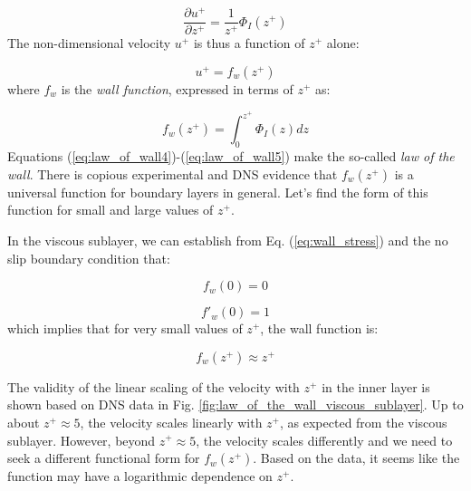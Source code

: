 \documentclass[12pt]{article}
\numberwithin{equation}{section}
\numberwithin{figure}{section}
\numberwithin{table}{section}
\begin{document}
\begin{equation}
  \frac{\partial u^+}{\partial z^+} = \frac{1}{z^+} \Phi_I\left(z^+\right)
  \label{eq:law_of_wall3}
\end{equation}
The non-dimensional velocity $u^+$ is thus a function of $z^+$ alone:

\begin{equation}
  u^+ = f_w(z^+)
  \label{eq:law_of_wall4}
\end{equation}
where $f_w$ is the \textit{wall function}, expressed in
terms of $z^+$ as:

\begin{equation}
  f_w(z^+) = \int_0^{z^+} \Phi_I(z) dz
  \label{eq:law_of_wall5}
\end{equation}
Equations (\ref{eq:law_of_wall4})-(\ref{eq:law_of_wall5}) make the so-called
\textit{law of the wall}.
There is copious experimental and DNS evidence that $f_w(z^+)$ is a universal
function for boundary layers in general.
Let's find the form of this function for small and large values of $z^+$.

In the viscous sublayer, we can establish from Eq. (\ref{eq:wall_stress}) and
the no slip boundary condition that:

\begin{equation}
  f_w(0) = 0
\end{equation}

\begin{equation}
  f'_w(0) = 1
\end{equation}
which implies that for very small values of $z^+$, the wall function is:

\begin{equation}
  f_w(z^+) \approx z^+
  \label{eq:law_of_wall6}
\end{equation}

The validity of the linear scaling of the velocity with $z^+$ in the inner layer
is shown based on DNS data in Fig. \ref{fig:law_of_the_wall_viscous_sublayer}.
Up to about $z^+ \approx 5$, the velocity scales linearly with $z^+$, as expected
from the viscous sublayer.
However, beyond $z^+ \approx 5$, the velocity scales differently and we need
to seek a different functional form for $f_w(z^+)$.
Based on the data, it seems like the function may have a logarithmic dependence
on $z^+$.
\end{document}
